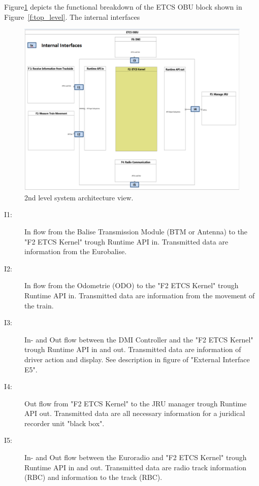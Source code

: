 Figure\ref{f:ETCS_OBU_decomposition} depicts the functional breakdown of the ETCS OBU block shown in Figure~\ref{f:top_level}. The internal interfaces
\begin{figure}
\centering
\includegraphics[width=\textwidth]{images/2ndlevelarchitecture}
\caption{2nd level system architecture view.}
\label{f:ETCS_OBU_decomposition}
\end{figure}
\begin{description}
\item[I1:] In flow from the Balise Transmission Module (BTM or Antenna) to the "F2 ETCS Kernel" trough Runtime API in. Transmitted data are information from the Eurobalise.

\item[I2:] In flow from the Odometrie (ODO) to the "F2 ETCS Kernel" trough Runtime API in. Transmitted data are information from the movement of the train.

\item[I3:] In- and Out flow between the DMI Controller and the "F2 ETCS Kernel" trough Runtime API in and out. Transmitted data are information of driver action and display. See description in figure of "External Interface E5".

\item[I4:] Out flow from "F2 ETCS Kernel" to the JRU manager trough Runtime API out. Transmitted data are all necessary information for a juridical recorder unit "black box".

\item[I5:] In- and Out flow between the Euroradio and "F2 ETCS Kernel" trough Runtime API in and out. Transmitted data are radio track information (RBC) and information to the track (RBC). 
\end{description}






